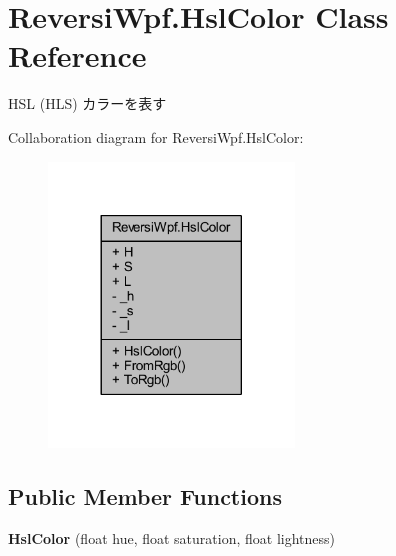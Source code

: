 \hypertarget{class_reversi_wpf_1_1_hsl_color}{}\section{Reversi\+Wpf.\+Hsl\+Color Class Reference}
\label{class_reversi_wpf_1_1_hsl_color}


H\+SL (H\+LS) カラーを表す  




Collaboration diagram for Reversi\+Wpf.\+Hsl\+Color\+:
\nopagebreak
\begin{figure}[H]
\begin{center}
\leavevmode
\includegraphics[width=185pt]{class_reversi_wpf_1_1_hsl_color__coll__graph}
\end{center}
\end{figure}
\subsection*{Public Member Functions}
\begin{DoxyCompactItemize}
\item 
\mbox{\label{class_reversi_wpf_1_1_hsl_color_a55ebdc383bf75f88cc61e6312f8899ba}} 
{\bfseries Hsl\+Color} (float hue, float saturation, float lightness)
\end{DoxyCompactItemize}
